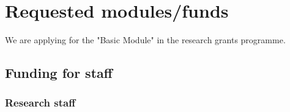 \FPset {}
\FPset {}

\FPset {} 
\FPset {} 
\FPset {} 
\FPset {} 

\FPset {} %

\FPmul \itemWiMASalery \Years \wiMASalery
\FPmul \iiktWiMASalery \Years \wiMASalery
\FPadd \totalWiMASalery \itemWiMASalery \iiktWiMASalery
\FPround \itemWiMASalery {}
\FPround \iiktWiMASalery {}
\FPround \totalWiMASalery {}

\FPmul \GroupAbaSaleryTotal \Months \GroupAbaSalery
\FPmul \GroupAmaSaleryTotal \Months \GroupAmaSalery
\FPmul \GroupBbaSaleryTotal \Months \GroupBbaSalery
\FPmul \GroupBmaSaleryTotal \Months \GroupBmaSalery

\FPadd {} \GroupAbaSaleryTotal
\FPadd \HiWiTotalSalery \HiWiTotalSalery \GroupAmaSaleryTotal
\FPadd \HiWiTotalSalery \HiWiTotalSalery \GroupBmaSaleryTotal

\FPadd \HiWiGroupATotalSalery \GroupAbaSaleryTotal \GroupAmaSaleryTotal
\FPadd \HiWiGroupBTotalSalery \GroupBbaSaleryTotal \GroupBmaSaleryTotal

\FPround \HiWiGroupATotalSalery {}
\FPround \HiWiGroupBTotalSalery {}

\FPround \HiWiTotalSalery {}

\FPround \GroupAbaSaleryTotal {}
\FPround \GroupAmaSaleryTotal {}
\FPround \GroupBbaSaleryTotal {}
\FPround \GroupBmaSaleryTotal {}

\FPadd \totalSalery \HiWiTotalSalery \totalWiMASalery
\FPround \totalSalery {}




\section{Requested modules/funds}
We are applying for the "Basic Module" in the research grants programme. 

\subsection{Funding for staff}
\subsubsection{Research staff}

